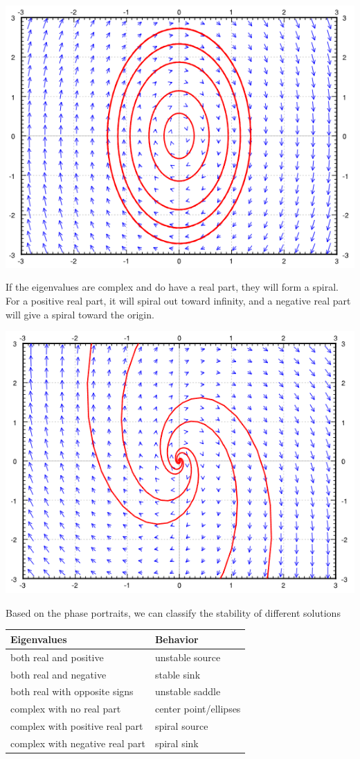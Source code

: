 \centerline{\includegraphics[scale=0.8]{Images/ODEPictures/phasePortrait4.png}}
If the eigenvalues are complex and do have a real part, they will form a spiral. For a positive real part, it will spiral out toward infinity, and a negative real part will give a spiral toward the origin.\\
\centerline{\includegraphics[scale=0.8]{Images/ODEPictures/phasePortrait5.png}}
Based on the phase portraits, we can classify the stability of different solutions\\
\begin{tabular}{l|l}
    Eigenvalues & Behavior\\
    \hline
     both real and positive & unstable source\\
    both real and negative & stable sink\\
    both real with opposite signs & unstable saddle\\
    complex with no real part & center point/ellipses\\
    complex with positive real part & spiral source\\
    complex with negative real part & spiral sink
\end{tabular}

